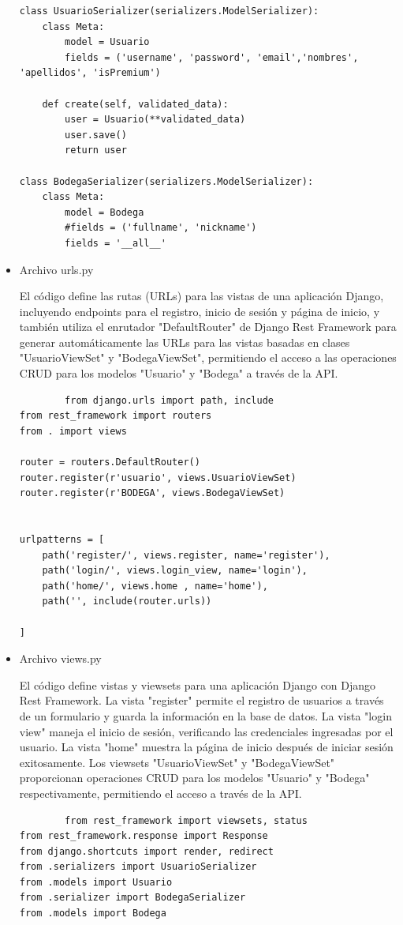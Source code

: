 \documentclass{article}
\begin{document}
\begin{itemize}
\begin{lstlisting}
class UsuarioSerializer(serializers.ModelSerializer):
    class Meta:
        model = Usuario
        fields = ('username', 'password', 'email','nombres', 'apellidos', 'isPremium')
        
    def create(self, validated_data):
        user = Usuario(**validated_data)
        user.save()
        return user
        
class BodegaSerializer(serializers.ModelSerializer):
    class Meta:
        model = Bodega
        #fields = ('fullname', 'nickname')
        fields = '__all__'
  \end{lstlisting}

     \item Archivo urls.py
     
        El código define las rutas (URLs) para las vistas de una aplicación Django, incluyendo endpoints para el registro, inicio de sesión y página de inicio, y también utiliza el enrutador "DefaultRouter" de Django Rest Framework para generar automáticamente las URLs para las vistas basadas en clases "UsuarioViewSet" y "BodegaViewSet", permitiendo el acceso a las operaciones CRUD para los modelos "Usuario" y "Bodega" a través de la API.
        \begin{lstlisting}
        from django.urls import path, include
from rest_framework import routers
from . import views

router = routers.DefaultRouter()
router.register(r'usuario', views.UsuarioViewSet)
router.register(r'BODEGA', views.BodegaViewSet)


urlpatterns = [
    path('register/', views.register, name='register'),
    path('login/', views.login_view, name='login'),
    path('home/', views.home , name='home'),
    path('', include(router.urls))
    
]
  \end{lstlisting}

     \item Archivo views.py
     
       El código define vistas y viewsets para una aplicación Django con Django Rest Framework. La vista "register" permite el registro de usuarios a través de un formulario y guarda la información en la base de datos. La vista "login view" maneja el inicio de sesión, verificando las credenciales ingresadas por el usuario. La vista "home" muestra la página de inicio después de iniciar sesión exitosamente. Los viewsets "UsuarioViewSet" y "BodegaViewSet" proporcionan operaciones CRUD para los modelos "Usuario" y "Bodega" respectivamente, permitiendo el acceso a través de la API.
        \begin{lstlisting}
        from rest_framework import viewsets, status
from rest_framework.response import Response
from django.shortcuts import render, redirect
from .serializers import UsuarioSerializer
from .models import Usuario
from .serializer import BodegaSerializer
from .models import Bodega



\end{lstlisting}
\end{itemize}
\end{document}
